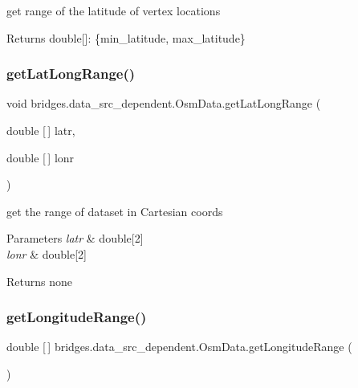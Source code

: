get range of the latitude of vertex locations \begin{DoxyReturn}{Returns}
double\mbox{[}\mbox{]}\+: \{min\+\_\+latitude, max\+\_\+latitude\} 
\end{DoxyReturn}
\mbox{\label{classbridges_1_1data__src__dependent_1_1_osm_data_a2f80de5c73dd1bf72378e6a0573ba663}} 
\subsubsection{\texorpdfstring{get\+Lat\+Long\+Range()}{getLatLongRange()}}
{\footnotesize\ttfamily void bridges.\+data\+\_\+src\+\_\+dependent.\+Osm\+Data.\+get\+Lat\+Long\+Range (\begin{DoxyParamCaption}\item[{double \mbox{[}$\,$\mbox{]}}]{latr,  }\item[{double \mbox{[}$\,$\mbox{]}}]{lonr }\end{DoxyParamCaption})}

get the range of dataset in Cartesian coords


\begin{DoxyParams}{Parameters}
{\em latr} & double\mbox{[}2\mbox{]} \\
\hline
{\em lonr} & double\mbox{[}2\mbox{]} \\
\hline
\end{DoxyParams}
\begin{DoxyReturn}{Returns}
none 
\end{DoxyReturn}
\mbox{\label{classbridges_1_1data__src__dependent_1_1_osm_data_a4a30fc62901cd0cea50d2e4a266c6c05}} 
\subsubsection{\texorpdfstring{get\+Longitude\+Range()}{getLongitudeRange()}}
{\footnotesize\ttfamily double \mbox{[}$\,$\mbox{]} bridges.\+data\+\_\+src\+\_\+dependent.\+Osm\+Data.\+get\+Longitude\+Range (\begin{DoxyParamCaption}{ }\end{DoxyParamCaption})}

